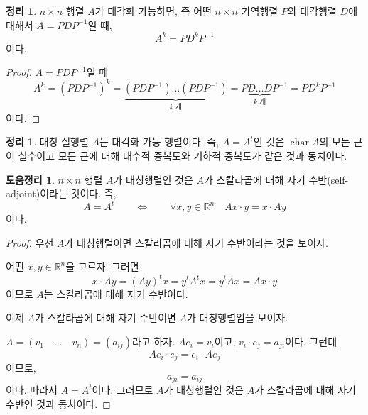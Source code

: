 \documentclass[unfonts,oneside,a4paper]{oblivoir}
\theoremstyle{definition}
\theoremstyle{theorem}
\newtheorem{theorem}[definition]{정리}
\theoremstyle{theorem}
\newtheorem{lemma}[definition]{도움정리}
\theoremstyle{remark}
\theoremstyle{remark}
\theoremstyle{remark}
\theoremstyle{remark}
\renewcommand{\vec}[1]{\bm{\mathit{#1}}}
\DeclareMathOperator{\Char}{char}
\begin{document}
\begin{theorem}
    $n \times n$ 행렬 $A$가 대각화 가능하면, 즉 어떤 $n \times n$ 가역행렬 $P$와 대각행렬 $D$에 대해서 $A = PDP^{-1}$일 때,
    \begin{equation*}
        A^k = PD^k P^{-1}
    \end{equation*}
    이다.
\end{theorem}

\begin{proof}
    $A = PDP^{-1}$일 때
    \begin{equation*}
        A^k = (PDP^{-1})^k = \underbrace{(PDP^{-1}) \dots (PDP^{-1})}_\text{$k$ 개} = P\underbrace{D\dots D}_\text{$k$ 개}P^{-1} = PD^kP^{-1}
    \end{equation*}
    이다.
\end{proof}

\begin{theorem}
    대칭 실행렬 $A$는 대각화 가능 행렬이다.
    즉, $A = A^t$인 것은 $\Char A$의 모든 근이 실수이고 모든 근에 대해 대수적 중복도와 기하적 중복도가 같은 것과 동치이다.
\end{theorem}

\begin{lemma} \label{lem:self_adjoint_sym}
    $n \times n$ 행렬 $A$가 대칭행렬인 것은 $A$가 스칼라곱에 대해 자기 수반(self-adjoint)이라는 것이다.
    즉,
    \begin{equation*}
        A = A^t \qquad \Longleftrightarrow \qquad \forall \vec x, \vec y \in \mathbb R^n \quad A\vec x \cdot \vec y = \vec x \cdot A \vec y
    \end{equation*}
    이다.
\end{lemma}

\begin{proof}
    우선 $A$가 대칭행렬이면 스칼라곱에 대해 자기 수반이라는 것을 보이자.

    어떤 $\vec x, \vec y \in \mathbb R^n$을 고르자.
    그러면
    \begin{equation*}
        \vec x \cdot A \vec y = (A\vec y)^t \vec x = \vec y^t A^t \vec x = \vec y^t A \vec x = A \vec x \cdot \vec y
    \end{equation*}
    이므로 $A$는 스칼라곱에 대해 자기 수반이다.

    이제 $A$가 스칼라곱에 대해 자기 수반이면 $A$가 대칭행렬임을 보이자.

    $A = (\vec v_1 \quad \dots \quad \vec v_n) = (a_{ij})$라고 하자.
    $A \vec e_i = \vec v_i$이고, $\vec v_i \cdot \vec e_j = a_{ji}$이다.
    그런데
    \begin{equation*}
        A \vec e_i \cdot e_j = e_i \cdot A \vec e_j
    \end{equation*}
    이므로,
    \begin{equation*}
        a_{ji} = a_{ij}
    \end{equation*}
    이다.
    따라서 $A = A^t$이다.
    그러므로 $A$가 대칭행렬인 것은 $A$가 스칼라곱에 대해 자기 수반인 것과 동치이다.
\end{proof}
\end{document}
